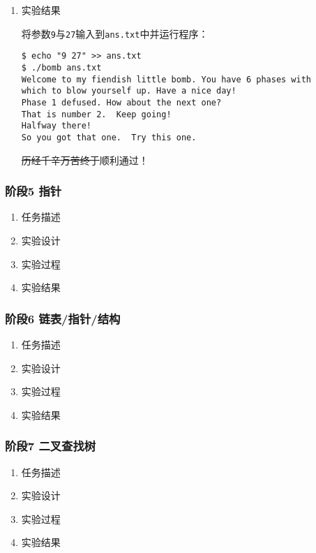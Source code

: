 \documentclass{paper}
\begin{document}
\begin{enumerate}
\begin{enumerate}
在\verb|main|函数中：
\begin{lstlisting}
int main(){
    for (int p1 = 0; p1 <= 14; ++p1){
        int ret = func4(p1, 0, 14);
        if (ret == 27){
            printf("p1 = %d, ret = %d\n", p1, ret);
            break;
        }
    }
    return 0;
}
\end{lstlisting}
将\verb|main|函数与\verb|func4|函数写入\verb|analyze_phase_4.c|，编译并运行：
\begin{lstlisting}
$ gcc analyze_phase_4.c -o main
$ ./main
p1 = 9, ret = 27
\end{lstlisting}
可以知道，输入的第一个参数为\verb|9|。

\end{enumerate}

\item 实验结果

将参数\verb|9|与\verb|27|输入到\verb|ans.txt|中并运行程序：
\begin{lstlisting}
$ echo "9 27" >> ans.txt
$ ./bomb ans.txt
Welcome to my fiendish little bomb. You have 6 phases with
which to blow yourself up. Have a nice day!
Phase 1 defused. How about the next one?
That is number 2.  Keep going!
Halfway there!
So you got that one.  Try this one.
\end{lstlisting}
\sout{历经千辛万苦终于}顺利通过！

\end{enumerate}

\subsubsection{阶段5 指针}
\begin{enumerate}
\item 任务描述
\item 实验设计
\item 实验过程
\item 实验结果
\end{enumerate}

\subsubsection{阶段6 链表/指针/结构}
\begin{enumerate}
\item 任务描述
\item 实验设计
\item 实验过程
\item 实验结果
\end{enumerate}

\subsubsection{阶段7 二叉查找树}
\begin{enumerate}
\item 任务描述
\item 实验设计
\item 实验过程
\item 实验结果
\end{enumerate}
\end{document}
